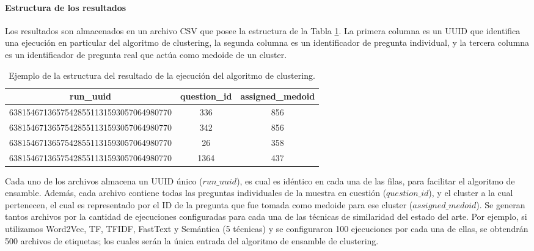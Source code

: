 \paragraph{Estructura de los resultados}
Los resultados son almacenados en un archivo CSV que posee la estructura de la Tabla \ref{tab:salida-clustering}. La primera columna es un UUID que identifica una ejecución en particular del algoritmo de clustering, la segunda columna es un identificador de pregunta individual, y la tercera columna es un identificador de pregunta real que actúa como medoide de un cluster.

\begin{table}[h!]
	\footnotesize
	\caption{Ejemplo de la estructura del resultado de la ejecución del algoritmo de clustering.}
	\begin{tabularx}{\textwidth}{ccc}
		\toprule
		\textbf{run\_uuid}                       & \textbf{question\_id} & \textbf{assigned\_medoid} \\
		\midrule
		63815467136575428551131593057064980770 & 336 & 856  \\
		63815467136575428551131593057064980770 & 342& 856 \\
		63815467136575428551131593057064980770 & 26 & 358 \\
		63815467136575428551131593057064980770 & 1364 & 437 \\
		\bottomrule
	\end{tabularx}
	\label{tab:salida-clustering}
\end{table}
Cada uno de los archivos almacena un UUID único (\(run\_uuid\)), es cual es idéntico en cada una de las filas, para facilitar el algoritmo de ensamble. Además, cada archivo contiene todas las preguntas individuales de la muestra en cuestión (\(question\_id\)), y el cluster a la cual pertenecen, el cual es representado por el ID de la pregunta que fue tomada como medoide para ese cluster (\(assigned\_medoid\)). Se generan tantos archivos por la cantidad de ejecuciones configuradas para cada una de las técnicas de similaridad del estado del arte. Por ejemplo, si utilizamos Word2Vec, TF, TFIDF, FastText y Semántica (5 técnicas) y se configuraron 100 ejecuciones por cada una de ellas, se obtendrán 500 archivos de etiquetas; los cuales serán la única entrada del algoritmo de ensamble de clustering.





